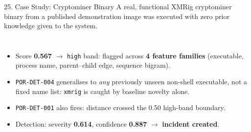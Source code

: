 \documentclass[aspectratio=169, 11pt]{beamer}
\begin{document}
\begin{frame}{25. Case Study: Cryptominer Binary}
    \footnotesize
    A real, functional XMRig cryptominer binary from a published demonstration image was executed with zero prior knowledge given to the system.
    \begin{columns}[T]
        \begin{itemize}\setlength\itemsep{3pt}
            \item Score \textbf{0.567} $\to$ \texttt{high} band: flagged across \textbf{4 feature families} (executable, process name, parent--child edge, sequence bigram).
            \item \texttt{POR-DET-004} generalises to \emph{any} previously unseen non-shell executable, not a fixed name list: \texttt{xmrig} is caught by baseline novelty alone.
            \item \texttt{POR-DET-001} also fires: distance crossed the 0.50 high-band boundary.
            \item Detection: severity \textbf{0.614}, confidence \textbf{0.887} $\to$ \textbf{incident created}.
        \end{itemize}
        \fboxsep=4pt
    \end{columns}
\end{frame}
\end{document}
